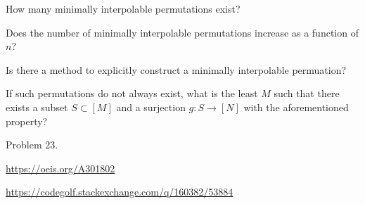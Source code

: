 \documentclass{article}
\begin{document}
\begin{related}
  \item How many minimally interpolable permutations exist?
  \item Does the number of minimally interpolable permutations increase as a
    function of $n$?
  \item Is there a method to explicitly construct a minimally interpolable
    permuation?
  \item If such permutations do not always exist, what is the least $M$ such
    that there exists a subset $S \subset [M]$ and a surjection
    $g\colon S\rightarrow [N]$ with the aforementioned property?
\end{related}
\begin{references}
  \item Problem 23.
  \item \url{https://oeis.org/A301802}
  \item \url{https://codegolf.stackexchange.com/q/160382/53884}
\end{references}
\end{document}
